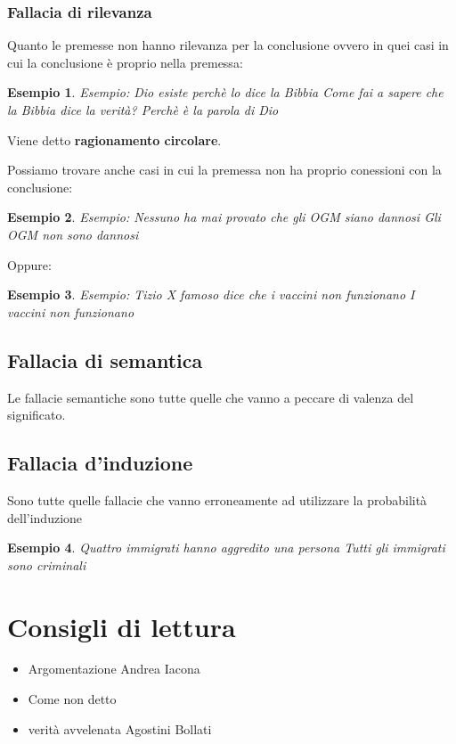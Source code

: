 \documentclass{article}
\newtheorem{exmp}{Esempio}[section]
\theoremstyle{definition}
\begin{document}
\subsubsection{Fallacia di rilevanza}
Quanto le premesse non hanno rilevanza per la conclusione ovvero in quei casi in cui la conclusione è proprio nella premessa:
\begin{exmp}
        Esempio: \newline
        Dio esiste perchè lo dice la Bibbia \newline
        Come fai a sapere che la Bibbia dice la verità? \newline
        Perchè è la parola di Dio \newline
\end{exmp}
Viene detto \textbf{ragionamento circolare}. \par

Possiamo trovare anche casi in cui la premessa non ha proprio conessioni con la conclusione:
\begin{exmp}
        Esempio: \newline
        Nessuno ha mai provato che gli OGM siano dannosi \newline
        Gli OGM non sono dannosi \newline
\end{exmp}
Oppure:
\begin{exmp}
        Esempio: \newline
        Tizio X famoso dice che i vaccini non funzionano\newline
        I vaccini non funzionano \newline
\end{exmp}



\subsection{Fallacia di semantica}
Le fallacie semantiche sono tutte quelle che vanno a peccare di valenza del significato. 


\subsection{Fallacia d'induzione}
Sono tutte quelle fallacie che vanno erroneamente ad utilizzare la probabilità dell'induzione
\begin{exmp}
        Quattro immigrati hanno aggredito una persona \newline
        Tutti gli immigrati sono criminali \newline
\end{exmp}


\newline
\section{Consigli di lettura}
\begin{itemize}
        \item Argomentazione Andrea Iacona
        \item Come non detto 
        \item verità avvelenata Agostini Bollati
\end{itemize}
\end{document}
